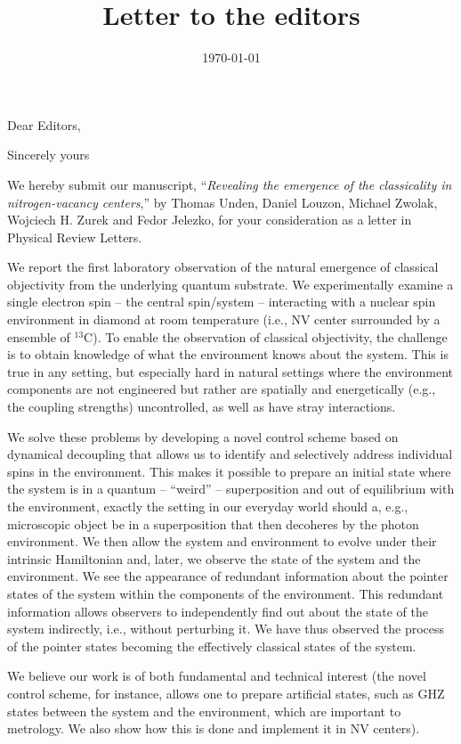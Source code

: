 \documentclass[10pt,a4paper,roman]{moderncv}        %
\title{Letter to the editors}                               %
\begin{document}
\date{\today}
\opening{Dear Editors,}
\closing{Sincerely yours}
\makelettertitle

\justify
We hereby submit our manuscript, ``\emph{Revealing the emergence of the classicality in nitrogen-vacancy centers},'' by Thomas Unden, Daniel Louzon, Michael Zwolak, Wojciech H. Zurek and Fedor Jelezko, for your consideration as a letter in Physical Review Letters. 

We report the first laboratory observation of the natural emergence of classical objectivity from the underlying quantum substrate. We experimentally examine a single electron spin -- the central spin/system -- interacting with a nuclear spin environment in diamond at room temperature (i.e., NV center surrounded by a ensemble of $^{13}$C). To enable the observation of classical objectivity, the challenge is to obtain knowledge of what the environment knows about the system. This is true in any setting, but especially hard in natural settings where the environment components are not engineered but rather are spatially and energetically (e.g., the coupling strengths) uncontrolled, as well as have stray interactions.

We solve these problems by developing a novel control scheme based on dynamical decoupling that allows us to identify and selectively address individual spins in the environment. This makes it possible to prepare an initial state where the system is in a quantum -- ``weird'' -- superposition and out of equilibrium with the environment, exactly the setting in our everyday world should a, e.g., microscopic object be in a superposition that then decoheres by the photon environment. We then allow the system and environment to evolve under their intrinsic Hamiltonian and, later, we observe the state of the system and the environment. We see the appearance of redundant information about the pointer states of the system within the components of the environment. This redundant information allows observers to independently find out about the state of the system indirectly, i.e., without perturbing it. We have thus observed the process of the pointer states becoming the effectively classical states of the system. 

We believe our work is of both fundamental and technical interest (the novel control scheme, for instance, allows one to prepare artificial states, such as GHZ states between the system and the environment, which are important to metrology. We also show how this is done and implement it in NV centers). 
\end{document}
